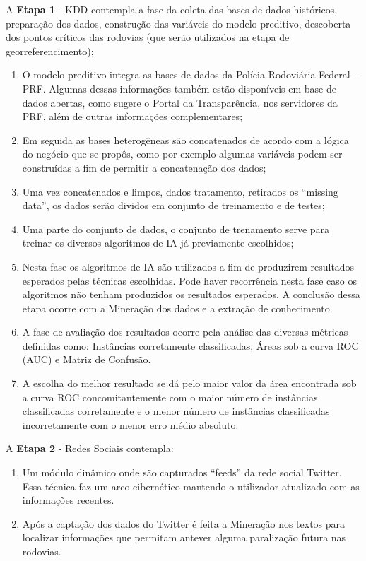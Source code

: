 A \textbf{Etapa 1} - KDD contempla a fase da coleta das bases de dados históricos, preparação dos dados, construção das variáveis do modelo preditivo, descoberta dos pontos críticos das rodovias (que serão utilizados na etapa de georreferencimento);
  \begin{enumerate}
    \item O modelo preditivo integra as bases de dados da Polícia Rodoviária Federal -- PRF.
     Algumas dessas informações também estão disponíveis em base de dados abertas, como sugere o Portal da Transparência, nos servidores da PRF, além de outras informações complementares;
    
    \item Em seguida as bases heterogêneas são concatenados de acordo com a lógica do negócio que se propôs, como por exemplo algumas variáveis podem ser construídas a fim de permitir a concatenação dos dados;
    
    \item Uma vez concatenados e limpos, dados tratamento, retirados os ``missing data'', os dados serão dividos em conjunto de treinamento e de testes;
   
    \item Uma parte do conjunto de dados, o conjunto de trenamento serve para treinar os diversos algoritmos de IA já previamente escolhidos;
    
    \item Nesta fase os algoritmos de IA são utilizados a fim de produzirem resultados esperados pelas técnicas escolhidas. Pode haver recorrência nesta fase caso os algoritmos não tenham produzidos os resultados esperados. A conclusão dessa etapa ocorre com a Mineração dos dados e a extração de conhecimento.
    
    \item A fase de avaliação dos resultados ocorre pela análise das diversas métricas definidas como: Instâncias corretamente classificadas, Áreas sob a curva ROC (AUC) e Matriz de Confusão.
     
	\item A escolha do melhor resultado se dá pelo maior valor da área encontrada sob a curva ROC concomitantemente com o maior número de instâncias classificadas corretamente e o menor número de instâncias classificadas incorretamente com o menor erro médio absoluto. 
\end{enumerate}
  
  
A \textbf{Etapa 2} - Redes Sociais contempla:
 \begin{enumerate}
 	\item Um módulo dinâmico onde são capturados ``feeds'' da rede social Twitter. 
 	     Essa técnica faz um arco cibernético mantendo o utilizador atualizado com as informações recentes.

 	\item Após a captação dos dados do Twitter é feita a Mineração nos textos para localizar informações que permitam antever alguma paralização futura nas rodovias. 
  \end{enumerate}

